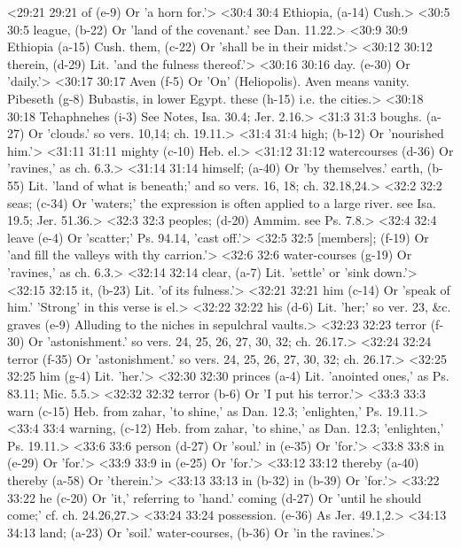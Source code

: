 <29:21 29:21  of (e-9)  Or 'a horn for.'>
<30:4 30:4  Ethiopia, (a-14) Cush.>
<30:5 30:5  league, (b-22)  Or 'land of the covenant.' see Dan. 11.22.>
<30:9 30:9  Ethiopia (a-15)  Cush.
  them, (c-22)  Or 'shall be in their midst.'>
<30:12 30:12  therein, (d-29)  Lit. 'and the fulness thereof.'>
<30:16 30:16  day. (e-30)  Or 'daily.'>
<30:17 30:17  Aven (f-5)  Or 'On' (Heliopolis). Aven means vanity.
  Pibeseth (g-8)  Bubastis, in lower Egypt.
  these (h-15)  i.e. the cities.>
<30:18 30:18  Tehaphnehes (i-3)  See Notes, Isa. 30.4; Jer. 2.16.>
<31:3 31:3  boughs. (a-27)  Or 'clouds.' so vers. 10,14; ch. 19.11.>
<31:4 31:4  high; (b-12)  Or 'nourished him.'>
<31:11 31:11  mighty (c-10)  Heb. el.>
<31:12 31:12  watercourses (d-36)  Or 'ravines,' as ch. 6.3.>
<31:14 31:14  himself; (a-40)  Or 'by themselves.'
  earth, (b-55)  Lit. 'land of what is beneath;' and so vers. 16, 18; ch. 32.18,24.>
<32:2 32:2  seas; (c-34)  Or 'waters;' the expression is often applied to a large  river. see Isa. 19.5; Jer. 51.36.>
<32:3 32:3  peoples; (d-20)  Ammim. see Ps. 7.8.>
<32:4 32:4  leave (e-4)  Or 'scatter;' Ps. 94.14, 'cast off.'>
<32:5 32:5  [members]; (f-19)  Or 'and fill the valleys with thy carrion.'>
<32:6 32:6  water-courses (g-19)  Or 'ravines,' as ch. 6.3.>
<32:14 32:14  clear, (a-7)  Lit. 'settle' or 'sink down.'>
<32:15 32:15  it, (b-23)  Lit. 'of its fulness.'>
<32:21 32:21  him (c-14)  Or 'speak of him.' 'Strong' in this verse is el.>
<32:22 32:22  his (d-6)  Lit. 'her;' so ver. 23, &c.
  graves (e-9)  Alluding to the niches in sepulchral vaults.>
<32:23 32:23  terror (f-30)  Or 'astonishment.' so vers. 24, 25, 26, 27, 30, 32; ch. 26.17.>
<32:24 32:24  terror (f-35)  Or 'astonishment.' so vers. 24, 25, 26, 27, 30, 32; ch. 26.17.>
<32:25 32:25  him (g-4)  Lit. 'her.'>
<32:30 32:30  princes (a-4)  Lit. 'anointed ones,' as Ps. 83.11; Mic. 5.5.>
<32:32 32:32  terror (b-6)  Or 'I put his terror.'>
<33:3 33:3  warn (c-15)  Heb. from zahar, 'to shine,' as Dan. 12.3; 'enlighten,' Ps. 19.11.>
<33:4 33:4  warning, (c-12)  Heb. from zahar, 'to shine,' as Dan. 12.3; 'enlighten,' Ps. 19.11.>
<33:6 33:6  person (d-27)  Or 'soul.'
  in (e-35) Or 'for.'>
<33:8 33:8  in (e-29) Or 'for.'>
<33:9 33:9  in (e-25)  Or 'for.'>
<33:12 33:12  thereby (a-40)  thereby (a-58)
  Or 'therein.'>
<33:13 33:13  in (b-32)  in (b-39)
  Or 'for.'>
<33:22 33:22  he (c-20)  Or 'it,' referring to 'hand.'
  coming (d-27)  Or 'until he should come;' cf. ch. 24.26,27.>
<33:24 33:24  possession. (e-36)  As Jer. 49.1,2.>
<34:13 34:13  land; (a-23)  Or 'soil.'
  water-courses, (b-36)  Or 'in the ravines.'>
